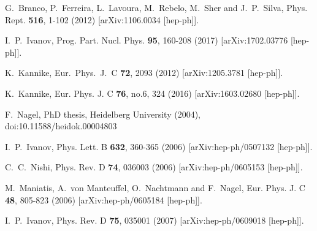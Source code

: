 \documentclass[11pt]{article}
\begin{document}
\begin{thebibliography}{99}

G.~Branco, P.~Ferreira, L.~Lavoura, M.~Rebelo, M.~Sher and J.~P.~Silva,
Phys. Rept. \textbf{516}, 1-102 (2012)
[arXiv:1106.0034 [hep-ph]].

I.~P.~Ivanov,
Prog. Part. Nucl. Phys. \textbf{95}, 160-208 (2017)
[arXiv:1702.03776 [hep-ph]].

K.~Kannike,
Eur.\ Phys.\ J.\ C {\bf 72}, 2093 (2012)
[arXiv:1205.3781 [hep-ph]].

K.~Kannike,
Eur. Phys. J. C \textbf{76}, no.6, 324 (2016)
[arXiv:1603.02680 [hep-ph]].


F.~Nagel, 
PhD thesis, Heidelberg University (2004),
doi:10.11588/heidok.00004803

I.~P.~Ivanov,
Phys. Lett. B \textbf{632}, 360-365 (2006)
[arXiv:hep-ph/0507132 [hep-ph]].

C.~C.~Nishi,
Phys. Rev. D \textbf{74}, 036003 (2006)
[arXiv:hep-ph/0605153 [hep-ph]].

M.~Maniatis, A.~von Manteuffel, O.~Nachtmann and F.~Nagel,
Eur. Phys. J. C \textbf{48}, 805-823 (2006)
[arXiv:hep-ph/0605184 [hep-ph]].

I.~P.~Ivanov,
Phys. Rev. D \textbf{75}, 035001 (2007)
[arXiv:hep-ph/0609018 [hep-ph]].


\end{thebibliography}
\end{document}
